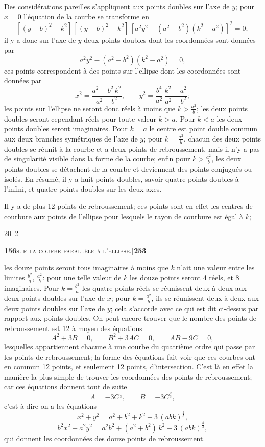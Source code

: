 \documentclass[11pt]{article}
\begin{document}
Des considérations pareilles s'appliquent aux points doubles sur l'axe de $y$; pour $x = 0$ l'équation de la courbe se transforme en
\[
[(y - b)^2 - k^2]\,[(y + b)^2 - k^2]\,[a^2y^2 - (a^2 - b^2)(k^2 - a^2)]^2 = 0;
\]
il y a donc sur l'axe de $y$ deux points doubles dont les coordonnées sont données par
\[
a^2y^2 - (a^2 - b^2)(k^2 - a^2) = 0,
\]
ces points correspondent à des points sur l'ellipse dont les coordonnées sont données par
\[
x^2 = \frac{a^2 - b^2\,k^2}{a^2 - b^2},\qquad y^2 = \frac{b^4}{a^2}\,\frac{k^2 - a^2}{a^2 - b^2};
\]
les points sur l'ellipse ne seront donc réels à moins que $k > \tfrac{a^2}{b}$; les deux points doubles seront cependant réels pour toute valeur $k > a$. Pour $k < a$ les deux points doubles seront imaginaires. Pour $k = a$ le centre est point double commun aux deux branches symétriques de l'axe de $y$; pour $k = \tfrac{a^2}{b}$, chacun des deux points doubles se réunit à la courbe et a deux points de rebroussement, mais il n'y a pas de singularité visible dans la forme de la courbe; enfin pour $k > \tfrac{a^2}{b}$, les deux points doubles se détachent de la courbe et deviennent des points conjugués ou isolés. En résumé, il y a huit points doubles, savoir quatre points doubles à l'infini, et quatre points doubles sur les deux axes.

Il y a de plus 12 points de rebroussement; ces points sont en effet les centres de courbure aux points de l'ellipse pour lesquels le rayon de courbure est égal à $k$;

\hfill 20--2

\newpage

\noindent\textbf{156}\hfill\textsc{sur la courbe parallèle à l'ellipse.}\hfill\textbf{[253}

\medskip

\noindent les douze points seront tous imaginaires à moins que $k$ n'ait une valeur entre les limites $\tfrac{b^2}{a}$, $\tfrac{a^2}{b}$: pour une telle valeur de $k$ les douze points seront 4 réels, et 8 imaginaires. Pour $k = \tfrac{b^2}{a}$ les quatre points réels se réunissent deux à deux aux deux points doubles sur l'axe de $x$; pour $k = \tfrac{a^2}{b}$, ils se réunissent deux à deux aux deux points doubles sur l'axe de $y$; cela s'accorde avec ce qui est dit ci-dessus par rapport aux points doubles. On peut encore trouver que le nombre des points de rebroussement est 12 à moyen des équations
\[
A^2 + 3B = 0,\qquad B^2 + 3AC = 0,\qquad AB - 9C = 0,
\]
lesquelles appartiennent chacune à une courbe du quatrième ordre qui passe par les points de rebroussement; la forme des équations fait voir que ces courbes ont en commun 12 points, et seulement 12 points, d'intersection. C'est là en effet la manière la plus simple de trouver les coordonnées des points de rebroussement; car ces équations donnent tout de suite
\[
A = -3C^{\frac{1}{3}},\qquad B = -3C^{\frac{2}{3}},
\]
c'est-à-dire on a les équations
\[
x^2 + y^2 = a^2 + b^2 + k^2 - 3\,(abk)^{\frac{2}{3}},
\]
\[
b^2x^2 + a^2y^2 = a^2b^2 + (a^2 + b^2)\,k^2 - 3\,(abk)^{\frac{4}{3}},
\]
qui donnent les coordonnées des douze points de rebroussement.
\end{document}
